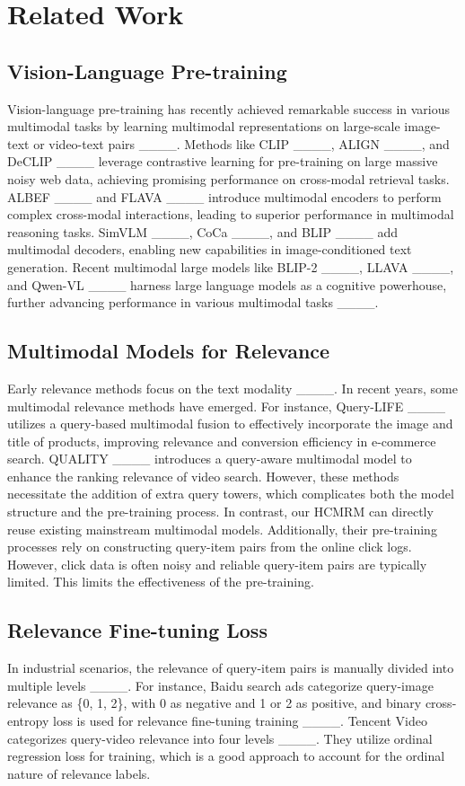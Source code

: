 \section{Related Work}
\subsection{Vision-Language Pre-training}
Vision-language pre-training has recently achieved remarkable success in various multimodal tasks by learning multimodal representations on large-scale image-text or video-text pairs ____. 
Methods like CLIP ____, ALIGN ____, and DeCLIP ____ leverage contrastive learning for pre-training on large massive noisy web data, achieving promising performance on cross-modal retrieval tasks. 
ALBEF ____ and FLAVA ____ introduce multimodal encoders to perform complex cross-modal interactions, leading to superior performance in multimodal reasoning tasks. SimVLM ____, CoCa ____, and BLIP ____ add multimodal decoders, enabling new capabilities in image-conditioned text generation. Recent multimodal large models like BLIP-2 ____, LLAVA ____, and Qwen-VL  ____ harness large language models as a cognitive powerhouse, further advancing performance in various multimodal tasks ____.

\subsection{Multimodal Models for Relevance}
Early relevance methods focus on the text modality ____. In recent years, some multimodal relevance methods have emerged. For instance, Query-LIFE ____ utilizes a query-based multimodal fusion to effectively incorporate the image and title of products, improving relevance and conversion efficiency in e-commerce search. QUALITY ____ introduces a query-aware multimodal model to enhance the ranking relevance of video search. However, these methods necessitate the addition of extra query towers, which complicates both the model structure and the pre-training process. In contrast, our HCMRM can directly reuse existing mainstream multimodal models. Additionally, their pre-training processes rely on constructing query-item pairs from the online click logs. However, click data is often noisy and reliable query-item pairs are typically limited. This limits the effectiveness of the pre-training.

\subsection{Relevance Fine-tuning Loss}
In industrial scenarios, the relevance of query-item pairs is manually divided into multiple levels ____. For instance, Baidu search ads categorize query-image relevance as \{0, 1, 2\}, with 0 as negative and 1 or 2 as positive, and binary cross-entropy loss is used for relevance fine-tuning training ____. Tencent Video categorizes query-video relevance into four levels ____. They utilize ordinal regression loss for training, which is a good approach to account for the ordinal nature of relevance labels.


